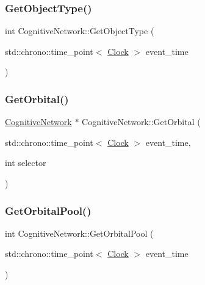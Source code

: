 \mbox{\label{classCognitiveNetwork_a1c92a8f6c42788cf8ca890f062f853a3}} 
\subsubsection{\texorpdfstring{Get\+Object\+Type()}{GetObjectType()}}
{\footnotesize\ttfamily int Cognitive\+Network\+::\+Get\+Object\+Type (\begin{DoxyParamCaption}\item[{std\+::chrono\+::time\+\_\+point$<$ \mbox{\hyperlink{universe_8h_a0ef8d951d1ca5ab3cfaf7ab4c7a6fd80}{Clock}} $>$}]{event\+\_\+time }\end{DoxyParamCaption})\hspace{0.3cm}{\ttfamily [inline]}}

\mbox{\label{classCognitiveNetwork_a69655ef1e12bac5f74c2eb85c72720f4}} 
\subsubsection{\texorpdfstring{Get\+Orbital()}{GetOrbital()}}
{\footnotesize\ttfamily \mbox{\hyperlink{classCognitiveNetwork}{Cognitive\+Network}} $\ast$ Cognitive\+Network\+::\+Get\+Orbital (\begin{DoxyParamCaption}\item[{std\+::chrono\+::time\+\_\+point$<$ \mbox{\hyperlink{universe_8h_a0ef8d951d1ca5ab3cfaf7ab4c7a6fd80}{Clock}} $>$}]{event\+\_\+time,  }\item[{int}]{selector }\end{DoxyParamCaption})}

\mbox{\label{classCognitiveNetwork_af5995eaa4ba35c555a6b65d895451f25}} 
\subsubsection{\texorpdfstring{Get\+Orbital\+Pool()}{GetOrbitalPool()}}
{\footnotesize\ttfamily int Cognitive\+Network\+::\+Get\+Orbital\+Pool (\begin{DoxyParamCaption}\item[{std\+::chrono\+::time\+\_\+point$<$ \mbox{\hyperlink{universe_8h_a0ef8d951d1ca5ab3cfaf7ab4c7a6fd80}{Clock}} $>$}]{event\+\_\+time }\end{DoxyParamCaption})\hspace{0.3cm}{\ttfamily [inline]}}

